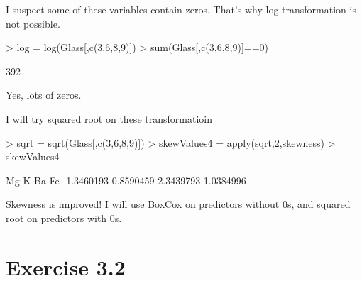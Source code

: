 \documentclass[12pt]{article}
\begin{document}
\begin{itemize}
I suspect some of these variables contain zeros. That's why log transformation is not possible.
\begin{Schunk}
\begin{Sinput}
> log = log(Glass[,c(3,6,8,9)])
> sum(Glass[,c(3,6,8,9)]==0)
\end{Sinput}
\begin{Soutput}
[1] 392
\end{Soutput}
\end{Schunk}
Yes, lots of zeros.

I will try squared root on these transformatioin
\begin{Schunk}
\begin{Sinput}
> sqrt = sqrt(Glass[,c(3,6,8,9)])
> skewValues4 = apply(sqrt,2,skewness)
> skewValues4
\end{Sinput}
\begin{Soutput}
        Mg          K         Ba         Fe 
-1.3460193  0.8590459  2.3439793  1.0384996 
\end{Soutput}
\end{Schunk}
Skewness is improved! I will use BoxCox on predictors without 0s, and squared root on predictors with 0s. 



\end{itemize}

\section{Exercise 3.2}
\end{document}
